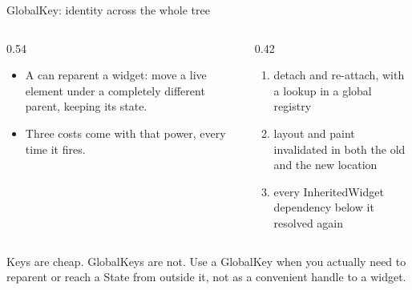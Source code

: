 \documentclass[10pt,aspectratio=169,t]{beamer}
\begin{document}
\begin{frame}[eyebrow=Rendering]{GlobalKey: identity across the whole tree}
  \begin{columns}[T]
    \begin{column}{0.54\textwidth}
      \begin{itemize}
        \item A  can reparent a widget: move a live element under a completely different parent, keeping its state.
        \item Three costs come with that power, every time it fires.
      \end{itemize}
    \end{column}
    \begin{column}{0.42\textwidth}
      \begin{enumerate}
        \item detach and re-attach, with a lookup in a global registry
        \item layout and paint invalidated in both the old and the new location
        \item every InheritedWidget dependency below it resolved again
      \end{enumerate}
    \end{column}
  \end{columns}
  \begin{takeaway}{Keys are cheap. GlobalKeys are not.}
    Use a GlobalKey when you actually need to reparent or reach a State from outside it, not as a convenient handle to a widget.
  \end{takeaway}
\end{frame}
\end{document}
